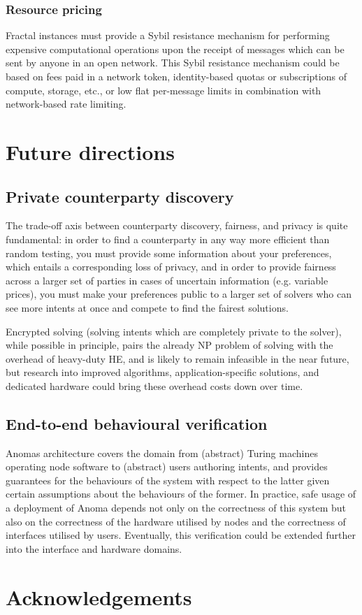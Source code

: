 \subsubsection{Resource pricing}\label{resource-pricing}

Fractal instances must provide a Sybil resistance mechanism for
performing expensive computational operations upon the receipt of
messages which can be sent by anyone in an open network. This Sybil
resistance mechanism could be based on fees paid in a network token,
identity-based quotas or subscriptions of compute, storage, etc., or low
flat per-message limits in combination with network-based rate limiting.

\section{Future directions}\label{future-directions}

\subsection{Private counterparty
discovery}\label{private-counterparty-discovery}

The trade-off axis between counterparty discovery, fairness, and privacy
is quite fundamental: in order to find a counterparty in any way more
efficient than random testing, you must provide some information about
your preferences, which entails a corresponding loss of privacy, and in
order to provide fairness across a larger set of parties in cases of
uncertain information (e.g. variable prices), you must make your
preferences public to a larger set of solvers who can see more intents
at once and compete to find the fairest solutions.

Encrypted solving (solving intents which are completely private to the
solver), while possible in principle, pairs the already NP problem of
solving with the overhead of heavy-duty HE, and is likely to remain
infeasible in the near future, but research into improved algorithms,
application-specific solutions, and dedicated hardware could bring these
overhead costs down over time.

\subsection{End-to-end behavioural
verification}\label{end-to-end-behavioural-verification}

Anoma\textquotesingle s architecture covers the domain from (abstract)
Turing machines operating node software to (abstract) users authoring
intents, and provides guarantees for the behaviours of the system with
respect to the latter given certain assumptions about the behaviours of
the former. In practice, safe usage of a deployment of Anoma depends not
only on the correctness of this system but also on the correctness of
the hardware utilised by nodes and the correctness of interfaces
utilised by users. Eventually, this verification could be extended
further into the interface and hardware domains.

\section{Acknowledgements}\label{acknowledgements}